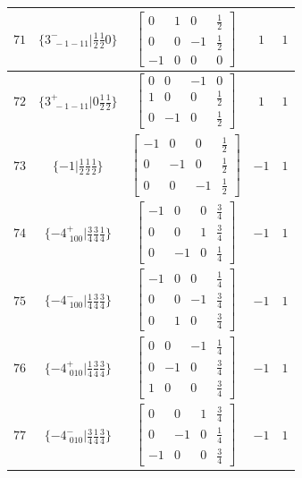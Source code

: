 \documentclass[fleqn,8pt]{jsarticle}
\begin{document}
\begin{longtable}{ccccc}
$ 71 $ & $ \{3^{-}_{\,\,-1-11}|\frac{1}{2} \frac{1}{2} 0\} $ & $ \begin{bmatrix} 0 & 1 & 0 & \frac{1}{2} \\ 0 & 0 & -1 & \frac{1}{2} \\ -1 & 0 & 0 & 0 \end{bmatrix} $ & $ 1 $ & $ 1 $ \\ \hline
$ 72 $ & $ \{3^{+}_{\,\,-1-11}|0 \frac{1}{2} \frac{1}{2}\} $ & $ \begin{bmatrix} 0 & 0 & -1 & 0 \\ 1 & 0 & 0 & \frac{1}{2} \\ 0 & -1 & 0 & \frac{1}{2} \end{bmatrix} $ & $ 1 $ & $ 1 $ \\ \hline
$ 73 $ & $ \{-1|\frac{1}{2} \frac{1}{2} \frac{1}{2}\} $ & $ \begin{bmatrix} -1 & 0 & 0 & \frac{1}{2} \\ 0 & -1 & 0 & \frac{1}{2} \\ 0 & 0 & -1 & \frac{1}{2} \end{bmatrix} $ & $ -1 $ & $ 1 $ \\ \hline
$ 74 $ & $ \{-4^{+}_{\,\,100}|\frac{3}{4} \frac{3}{4} \frac{1}{4}\} $ & $ \begin{bmatrix} -1 & 0 & 0 & \frac{3}{4} \\ 0 & 0 & 1 & \frac{3}{4} \\ 0 & -1 & 0 & \frac{1}{4} \end{bmatrix} $ & $ -1 $ & $ 1 $ \\ \hline
$ 75 $ & $ \{-4^{-}_{\,\,100}|\frac{1}{4} \frac{3}{4} \frac{3}{4}\} $ & $ \begin{bmatrix} -1 & 0 & 0 & \frac{1}{4} \\ 0 & 0 & -1 & \frac{3}{4} \\ 0 & 1 & 0 & \frac{3}{4} \end{bmatrix} $ & $ -1 $ & $ 1 $ \\ \hline
$ 76 $ & $ \{-4^{+}_{\,\,010}|\frac{1}{4} \frac{3}{4} \frac{3}{4}\} $ & $ \begin{bmatrix} 0 & 0 & -1 & \frac{1}{4} \\ 0 & -1 & 0 & \frac{3}{4} \\ 1 & 0 & 0 & \frac{3}{4} \end{bmatrix} $ & $ -1 $ & $ 1 $ \\ \hline
$ 77 $ & $ \{-4^{-}_{\,\,010}|\frac{3}{4} \frac{1}{4} \frac{3}{4}\} $ & $ \begin{bmatrix} 0 & 0 & 1 & \frac{3}{4} \\ 0 & -1 & 0 & \frac{1}{4} \\ -1 & 0 & 0 & \frac{3}{4} \end{bmatrix} $ & $ -1 $ & $ 1 $ \\ \hline

\end{longtable}
\end{document}
